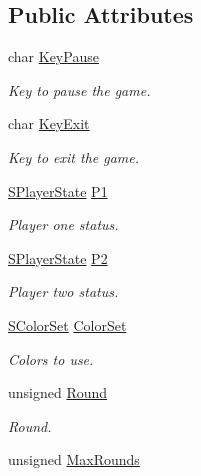 \subsection*{Public Attributes}
\begin{DoxyCompactItemize}
\item 
char \hyperlink{struct_chase_game_1_1_s_game_status_aaa0cca00432a2ac7fae4be521164f5c2}{Key\-Pause}
\begin{DoxyCompactList}\small\item\em Key to pause the game. \end{DoxyCompactList}\item 
char \hyperlink{struct_chase_game_1_1_s_game_status_a6a88e0903d13f10f4fcf8050157b2bdb}{Key\-Exit}
\begin{DoxyCompactList}\small\item\em Key to exit the game. \end{DoxyCompactList}\item 
\hyperlink{struct_chase_game_1_1_s_player_state}{S\-Player\-State} \hyperlink{struct_chase_game_1_1_s_game_status_ae939192c0ce625f9cbec50549ec88fac}{P1}
\begin{DoxyCompactList}\small\item\em Player one status. \end{DoxyCompactList}\item 
\hyperlink{struct_chase_game_1_1_s_player_state}{S\-Player\-State} \hyperlink{struct_chase_game_1_1_s_game_status_a21840b6b133cd5a73d5c0cd3b01116e2}{P2}
\begin{DoxyCompactList}\small\item\em Player two status. \end{DoxyCompactList}\item 
\hyperlink{struct_chase_game_1_1_s_color_set}{S\-Color\-Set} \hyperlink{struct_chase_game_1_1_s_game_status_adc7431634611868499b650c2dc6a67b6}{Color\-Set}
\begin{DoxyCompactList}\small\item\em Colors to use. \end{DoxyCompactList}\item 
unsigned \hyperlink{struct_chase_game_1_1_s_game_status_afd8742d8a27af58077d4a9fe9f9b1c4f}{Round}
\begin{DoxyCompactList}\small\item\em Round. \end{DoxyCompactList}\item 
unsigned \hyperlink{struct_chase_game_1_1_s_game_status_a812deafc733953eaa199eba4ea8216f7}{Max\-Rounds}

\end{DoxyCompactItemize}
